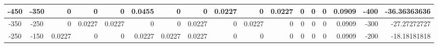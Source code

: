 \begin{table}[ht]
\begin{adjustbox}{width = \textwidth, center}
\begin{tabular}{|cc|r|r|r|r|r|r|r|r|r|r|r|r|r|r|r|}
        \rowcolor[HTML]{FFFFFF} 
        \cellcolor[HTML]{D0E0E3}-450           & \cellcolor[HTML]{EBF1FC}-350           & 0                                              & 0                                              & 0                                              & \cellcolor[HTML]{8FD2B1}0.0455                 & 0                                              & 0                                              & \cellcolor[HTML]{C7E9D8}0.0227                 & 0                                               & \cellcolor[HTML]{C7E9D8}0.0227                  & 0                                               & 0                                               & 0                                               & \cellcolor[HTML]{D9D2E9}0.0909                                                  & \cellcolor[HTML]{D9D2E9}-400                                            & \cellcolor[HTML]{D9D2E9}-36.36363636                                                             \\ \hline
        \cellcolor[HTML]{D0E0E3}-350           & \cellcolor[HTML]{EBF1FC}-250           & \cellcolor[HTML]{FFFFFF}0                      & \cellcolor[HTML]{C7E9D8}0.0227                 & \cellcolor[HTML]{C7E9D8}0.0227                 & \cellcolor[HTML]{FFFFFF}0                      & \cellcolor[HTML]{FFFFFF}0                      & \cellcolor[HTML]{C7E9D8}0.0227                 & \cellcolor[HTML]{FFFFFF}0                      & \cellcolor[HTML]{C7E9D8}0.0227                  & \cellcolor[HTML]{FFFFFF}0                       & \cellcolor[HTML]{FFFFFF}0                       & \cellcolor[HTML]{FFFFFF}0                       & \cellcolor[HTML]{FFFFFF}0                       & \cellcolor[HTML]{D9D2E9}0.0909                                                  & \cellcolor[HTML]{D9D2E9}-300                                            & \cellcolor[HTML]{D9D2E9}-27.27272727                                                             \\ \hline
        \cellcolor[HTML]{D0E0E3}-250           & \cellcolor[HTML]{EBF1FC}-150           & \cellcolor[HTML]{C7E9D8}0.0227                 & \cellcolor[HTML]{FFFFFF}0                      & \cellcolor[HTML]{FFFFFF}0                      & \cellcolor[HTML]{C7E9D8}0.0227                 & \cellcolor[HTML]{C7E9D8}0.0227                 & \cellcolor[HTML]{C7E9D8}0.0227                 & \cellcolor[HTML]{FFFFFF}0                      & \cellcolor[HTML]{FFFFFF}0                       & \cellcolor[HTML]{FFFFFF}0                       & \cellcolor[HTML]{FFFFFF}0                       & \cellcolor[HTML]{FFFFFF}0                       & \cellcolor[HTML]{FFFFFF}0                       & \cellcolor[HTML]{D9D2E9}0.0909                                                  & \cellcolor[HTML]{D9D2E9}-200                                            & \cellcolor[HTML]{D9D2E9}-18.18181818                                                             \\ \hline

\end{tabular}
\end{adjustbox}
\end{table}
